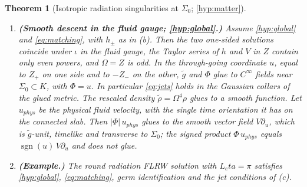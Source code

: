 \documentclass[11pt]{article}
\theoremstyle{canonmath}
\theoremstyle{canonpostulate}
\theoremstyle{canonproposition}
\theoremstyle{canonmath}
\newtheorem{mainthm}{Theorem}
\theoremstyle{canonproposition}
\providecommand{\Klein}{\mathcal{K}}
\def\mathrm#1{#1}%
\def\mathcal#1{#1}%
\def\eta{eta}%
\begin{document}
\begin{mainthm}[Isotropic radiation singularities at $\Sigma_0$; \ref{hyp:matter}]
\begin{enumerate}[label=(\alph*)]
\begin{equation}
\partial^j_{s}\tilde h_+(0) = (-1)^j\,T\bigl(\partial^j_{s}\tilde h_-(0)\bigr), \qquad \partial^j_{s}\Omega_+(0) = (-1)^{j+1}\,T\bigl(\partial^j_{s}\Omega_-(0)\bigr).
\label{eq:jets}
\end{equation}
Suppose in addition that the two one-sided solutions coincide as germs, $T\tilde h_-(s) = \tilde h_+(s)$ and $T\Omega_-(s) = \Omega_+(s)$ (\emph{germ identification}). Then \eqref{eq:jets} reduces to the vanishing of all odd $s$-derivatives of $\tilde h_+$ and all even $s$-derivatives of $\Omega_+$ at $s=0$. The same statements hold with $C^k$ in place of $C^\infty$ and $j\le k$ in \eqref{eq:jets}. The round solution satisfies germ identification and the reduced conditions, and so do the admissible modes of \cref{thm:D} at linear order.
\item \textbf{(Smooth descent in the fluid gauge; \ref{hyp:global}.)} Assume \ref{hyp:global} and \eqref{eq:matching}, with $h_\pm$ as in (b). Then the two one-sided solutions coincide under $\iota$ in the fluid gauge, the Taylor series of $h$ and $V$ in $Z$ contain only even powers, and $\Omega = Z$ is odd. In the through-going coordinate $u$, equal to $Z_+$ on one side and to $-Z_-$ on the other, $\tilde g$ and $\Phi$ glue to $C^\infty$ fields near $\Sigma_0\subset\Klein$, with $\Phi = u$. In particular \eqref{eq:jets} holds in the Gaussian collars of the glued metric. The rescaled density $\tilde\rho = \Omega^4\rho$ glues to a smooth function. Let $u_{\mathrm{phys}}$ be the physical fluid velocity, with the single time orientation it has on the connected slab. Then $|\Phi|\,u_{\mathrm{phys}}$ glues to the smooth vector field $V\partial_u$, which is $\tilde g$-unit, timelike and transverse to $\Sigma_0$; the signed product $\Phi\,u_{\mathrm{phys}}$ equals $\operatorname{sgn}(u)\,V\partial_u$ and does not glue.
\item \textbf{(Example.)} The round radiation FLRW solution with $L_\eta = \pi$ satisfies \ref{hyp:global}, \eqref{eq:matching}, germ identification and the jet conditions of (c).
\end{enumerate}
\end{mainthm}
\end{document}
